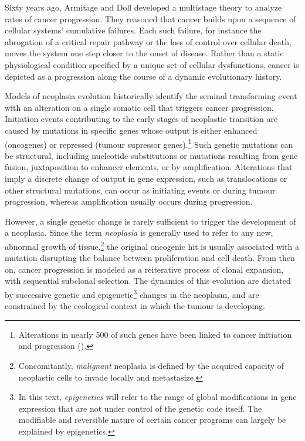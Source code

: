 Sixty years ago, Armitage and Doll developed a multistage theory to analyze
rates of cancer progression.\cite{armitage_age_1954} They reasoned that cancer
builds upon a sequence of cellular systems' cumulative failures.  Each such
failure, for instance the abrogation of a critical  repair
pathway or the loss of control over cellular death, moves the system one step
closer to the onset of disease.\cite{frank_dynamics_2007} Rather than a static
physiological condition specified by a unique set of cellular dysfunctions,
cancer is depicted as a progression along the course of a dynamic evolutionary
history.

Models of neoplasia evolution historically identify the seminal transforming
event with an alteration on a single somatic cell that triggers cancer
progression.  Initiation events contributing to the early stages of neoplastic
transition are caused by mutations in specific genes whose output is either
enhanced (oncogenes) or repressed (tumour supressor genes).\footnote{Alterations
  in nearly 500 of such genes have been linked to cancer initiation and
  progression (\citealp{forbes_catalogue_2008}).}  Such genetic mutations can be
structural, including nucleotide substitutions or mutations resulting from gene
fusion,\cite{konopka_cell_1985} juxtaposition to enhancer
elements,\cite{tsujimoto_t14;18_1985} or by amplification.  Alterations that
imply a discrete change of output in gene expression, such as translocations or
other structural mutations, can occur as initiating
events\cite{finger_common_1986} or during tumour progression, whereas
amplification usually occurs during progression.\cite{croce_oncogenes_2008}

However, a single genetic change is rarely sufficient to trigger the development
of a neoplasia.  Since the term \emph{neoplasia} is generally used to refer to
any new, abnormal growth of tissue,\footnote{Concomitantly, \emph{malignant}
  neoplasia is defined by the acquired capacity of neoplastic cells to invade
  locally and metastasize.} the original oncogenic hit is usually associated
with a mutation disrupting the balance between proliferation and cell death.
From then on, cancer progression is modeled as a reiterative process of clonal
expansion, with sequential subclonal
selection.\cite{nowell_clonal_1976,greaves_clonal_2012} The dynamics of this
evolution are dictated by successive genetic and epigenetic\footnote{In this
  text, \emph{epigenetics} will refer to the range of global modifications in
  gene expression that are not under control of the genetic code itself.  The
  modifiable and reversible nature of certain cancer programs can largely be
  explained by epigenetics.} changes in the neoplasm, and are constrained by the
ecological context in which the tumour is developing.

